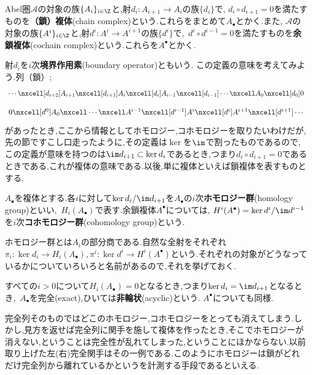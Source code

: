 \begin{defi}[複体]
	Abel圏$\mathscr{A}$の対象の族$\{A_i\}_{i\in\Z}$と,射$d_i:A_{i+1}\to A_i$の族$\{d_i\}$で, $d_{i}\circ d_{i+1}=0$を満たすものを\textbf{（鎖）複体}(chain complex)という.これらをまとめて$A_\bullet$とかく.また, $\mathscr{A}$の対象の族$\{A^i\}_{i\in\Z}$と,射$d^i:A^i\to A^{i+1}$の族$\{d^i\}$で,~$d^i\circ d^{i-1}=0$を満たすものを\textbf{余鎖複体}(cochain complex)という.これらを$A^\bullet$とかく.
\end{defi}

射$d_i$を$i$次\textbf{境界作用素}(boundary operator)ともいう. この定義の意味を考えてみよう.列（鎖）;
\[\begin{tikzcd}
\cdots\nxcell[d_{i+2}]A_{i+1}\nxcell[d_{i+1}]A_i\nxcell[d_i]A_{i-1}\nxcell[d_{i-1}]\cdots\nxcell A_0\nxcell[d_0]0
\end{tikzcd}\]
\[\begin{tikzcd}
0\nxcell[d^0]A_0\nxcell\cdots\nxcell A^{i-1}\nxcell[d^{i-1}]A^i\nxcell[d^i]A^{i+1}\nxcell[d^{i+1}]\cdots
\end{tikzcd}\]
があったとき,ここから情報としてホモロジー,コホモロジーを取りたいわけだが,先の節ですこし口走ったように,その定義は$\ker$を$\im$で割ったものであるので,この定義が意味を持つのは$\im d_{i+1}\subset\ker d_i$であるとき,つまり$d_i\circ d_{i+1}=0$であるときである.これが複体の意味である.以後,単に複体といえば鎖複体を表すものとする.
\begin{defi}
	$A_\bullet$を複体とする.各$i$に対して$\ker d_i/\im d_{i+1}$を$A_\bullet$の$i$次\textbf{ホモロジー群}(homology group)といい,~$H_i(A_\bullet)$で表す.余鎖複体$A^\bullet$については, $H^i(A^\bullet)=\ker d^i/\im d^{i-1}$を$i$次\textbf{コホモロジー群}(cohomology group)という.
\end{defi}

ホモロジー群とは$A_i$の部分商である.自然な全射をそれぞれ$\pi_i:\ker d_i\to H_i(A_\bullet),\pi^i:\ker d^i\to H^i(A^\bullet)$という.それぞれの対象がどうなっているかについていろいろと名前があるので,それを挙げておく.
\begin{defi}[非輪状]
	すべての$i>0$について$H_i(A_\bullet)=0$となるとき,つまり$\ker d_i=\im d_{i+1}$となるとき,~$A_\bullet$を完全(exact),ひいては\textbf{非輪状}(acyclic)という. $A^\bullet$についても同様.
\end{defi}

完全列そのものではどこのホモロジー,コホモロジーをとっても消えてしまう.しかし,見方を返せば完全列に関手を施して複体を作ったとき,そこでホモロジーが消えない,ということは完全性が乱れてしまった,ということにほかならない.以前取り上げた左(右)完全関手はその一例である.このようにホモロジーは鎖がどれだけ完全列から離れているかというを計測する手段であるといえる.

